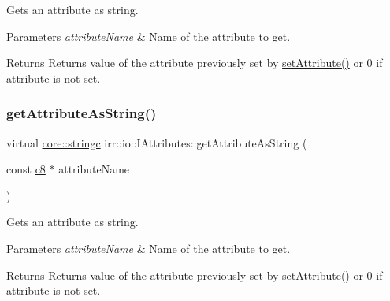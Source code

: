 Gets an attribute as string. 


\begin{DoxyParams}{Parameters}
{\em attribute\+Name} & Name of the attribute to get. \\
\hline
\end{DoxyParams}
\begin{DoxyReturn}{Returns}
Returns value of the attribute previously set by \hyperlink{classirr_1_1io_1_1IAttributes_a03fa31acb481ae23678676cc183f09a6}{set\+Attribute()} or 0 if attribute is not set. 
\end{DoxyReturn}
\mbox{\label{classirr_1_1io_1_1IAttributes_a60f395fd008a70cc0531fa038c81f0ea}} 
\subsubsection{\texorpdfstring{get\+Attribute\+As\+String()}{getAttributeAsString()}\hspace{0.1cm}{\footnotesize\ttfamily [2/6]}}
{\footnotesize\ttfamily virtual \hyperlink{namespaceirr_1_1core_ab26a0e0359206b5a694f35c37c829d7f}{core\+::stringc} irr\+::io\+::\+I\+Attributes\+::get\+Attribute\+As\+String (\begin{DoxyParamCaption}\item[{const \hyperlink{namespaceirr_a9395eaea339bcb546b319e9c96bf7410}{c8} $\ast$}]{attribute\+Name }\end{DoxyParamCaption})\hspace{0.3cm}{\ttfamily [pure virtual]}}



Gets an attribute as string. 


\begin{DoxyParams}{Parameters}
{\em attribute\+Name} & Name of the attribute to get. \\
\hline
\end{DoxyParams}
\begin{DoxyReturn}{Returns}
Returns value of the attribute previously set by \hyperlink{classirr_1_1io_1_1IAttributes_a03fa31acb481ae23678676cc183f09a6}{set\+Attribute()} or 0 if attribute is not set. 
\end{DoxyReturn}
\mbox{\label{classirr_1_1io_1_1IAttributes_a8d10d4874bcb90143ba11f6c548cff42}} 
